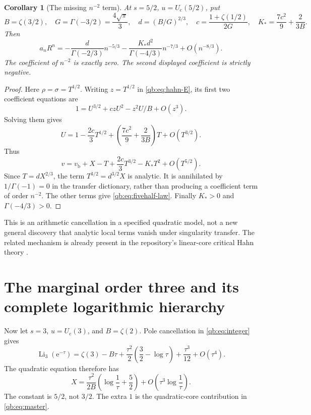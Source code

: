 \documentclass[11pt,a4paper]{article}
\newtheorem{corollary}[theorem]{Corollary}
\theoremstyle{definition}\newtheorem{definition}[theorem]{Definition}
\theoremstyle{remark}\newtheorem{remark}[theorem]{Remark}
\newcommand{\Li}{\operatorname{Li}}
\newcommand{\ee}{\mathrm e}
\newcommand{\Uc}{U_{\mathrm c}}
\newcommand{\vb}{v_{\mathrm b}}
\numberwithin{equation}{section}
\begin{document}
\begin{corollary}[The missing $n^{-2}$ term]\label{qb:cor:fivehalves}
At $s=5/2$, $u=\Uc(5/2)$, put
\begin{equation}\label{qb:eq:fivehalf-constants}
 B=\zeta(3/2),\quad G=\Gamma(-3/2)=\frac{4\sqrt\pi}{3},\quad
 d=(B/G)^{2/3},\quad c=\frac{1+\zeta(1/2)}{2G},\quad
 K_* =\frac{7c^2}{9}+\frac{2}{3B}.
\end{equation}
Then
\begin{equation}\label{qb:eq:fivehalf-law}
 a_nR^n=
 -\frac{d}{\Gamma(-2/3)}n^{-5/3}
 -\frac{K_*d^2}{\Gamma(-4/3)}n^{-7/3}
 +O(n^{-8/3}).
\end{equation}
The coefficient of $n^{-2}$ is exactly zero. The second displayed
coefficient is strictly negative.
\end{corollary}
\begin{proof}
Here $\rho=\sigma=T^{1/2}$. Writing $z=T^{1/2}$ in
\eqref{qb:eq:hahn-E}, its first two coefficient equations are
\[
 1=U^{3/2}+czU^2-z^2U/B+O(z^3).
\]
Solving them gives
\begin{equation}\label{qb:eq:fivehalf-U}
 U=1-\frac{2c}{3}T^{1/2}
      +\left(\frac{7c^2}{9}+\frac2{3B}\right)T+O(T^{3/2}).
\end{equation}
Thus
\[
 v=\vb+X-T+\frac{2c}{3}T^{3/2}-K_*T^2+O(T^{5/2}).
\]
Since $T=dX^{2/3}$, the term $T^{3/2}=d^{3/2}X$ is analytic. It is
annihilated by $1/\Gamma(-1)=0$ in the transfer dictionary, rather than
producing a coefficient term of order $n^{-2}$. The other terms give
\eqref{qb:eq:fivehalf-law}. Finally $K_*>0$ and
$\Gamma(-4/3)>0$.
\end{proof}

This is an arithmetic cancellation in a specified quadratic model, not a
new general discovery that analytic local terms vanish under singularity
transfer. The related mechanism is already present in the repository's
linear-core critical Hahn theory \cite{repocritical}.

\section{The marginal order three and its complete logarithmic hierarchy}
\label{qb:sec:marginal}

Now let $s=3$, $u=\Uc(3)$, and $B=\zeta(2)$. Pole cancellation in
\eqref{qb:eq:integer} gives
\begin{equation}\label{qb:eq:Li3-local}
 \Li_3(\ee^{-\tau})=\zeta(3)-B\tau+
 \frac{\tau^2}{2}\left(\frac32-\log\tau\right)
 +\frac{\tau^3}{12}+O(\tau^4).
\end{equation}
The quadratic equation therefore has
\begin{equation}\label{qb:eq:marginal-H}
 X=\frac{\tau^2}{2B}\left(\log\frac1\tau+\frac52\right)
       +O\left(\tau^3\log\frac1\tau\right).
\end{equation}
The constant is $5/2$, not $3/2$. The extra $1$ is the quadratic-core
contribution in \eqref{qb:eq:master}.
\end{document}
